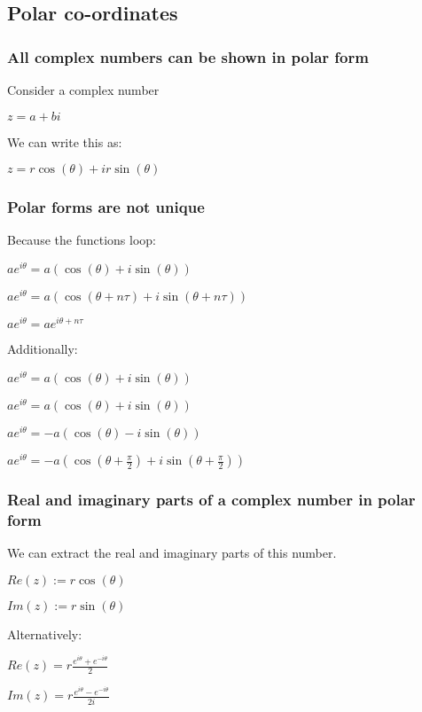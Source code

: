 
\subsection{Polar co-ordinates}

\subsubsection{All complex numbers can be shown in polar form}

Consider a complex number

\(z=a+bi\)

We can write this as:

\(z=r\cos(\theta ) + ir\sin(\theta )\)

\subsubsection{Polar forms are not unique}

Because the functions loop:

\(ae^{i\theta }=a(\cos(\theta )+i\sin(\theta ))\)

\(ae^{i\theta }=a(\cos(\theta +n\tau )+i\sin(\theta +n\tau ))\)

\(ae^{i\theta }= ae^{i\theta +n\tau}\)

Additionally:

\(ae^{i\theta }=a(\cos(\theta )+i\sin(\theta ))\)

\(ae^{i\theta }=a(\cos(\theta )+i\sin(\theta ))\)

\(ae^{i\theta }=-a(\cos(\theta )-i\sin(\theta ))\)

\(ae^{i\theta }=-a(\cos(\theta +\frac{\pi }{2})+i\sin(\theta +\frac{\pi }{2}))\)

\subsubsection{Real and imaginary parts of a complex number in polar form}

We can extract the real and imaginary parts of this number.

\(Re(z):=r\cos (\theta )\)

\(Im(z):=r\sin (\theta )\)

Alternatively:

\(Re(z)=r\frac{e^{i\theta }+e^{-i\theta }}{2}\)

\(Im(z)=r\frac{e^{i\theta }-e^{-i\theta }}{2i}\)

